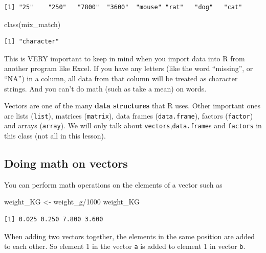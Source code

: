 \documentclass[
  letterpaper,
  DIV=11,
  numbers=noendperiod,
  oneside]{scrreprt}
\newenvironment{Shaded}{\begin{snugshade}}{\end{snugshade}}
\newcommand{\DecValTok}[1]{\textcolor[rgb]{0.68,0.00,0.00}{#1}}
\newcommand{\FunctionTok}[1]{\textcolor[rgb]{0.28,0.35,0.67}{#1}}
\newcommand{\NormalTok}[1]{\textcolor[rgb]{0.00,0.23,0.31}{#1}}
\newcommand{\OtherTok}[1]{\textcolor[rgb]{0.00,0.23,0.31}{#1}}
\newcommand{\SpecialCharTok}[1]{\textcolor[rgb]{0.37,0.37,0.37}{#1}}
\begin{document}
\begin{verbatim}
[1] "25"    "250"   "7800"  "3600"  "mouse" "rat"   "dog"   "cat"  
\end{verbatim}

\begin{Shaded}
\begin{Highlighting}[]
\FunctionTok{class}\NormalTok{(mix\_match)}
\end{Highlighting}
\end{Shaded}

\begin{verbatim}
[1] "character"
\end{verbatim}

This is VERY important to keep in mind when you import data into R from
another program like Excel. If you have any letters (like the word
``missing'', or ``NA'') in a column, all data from that column will be
treated as character strings. And you can't do math (such as take a
mean) on words.

Vectors are one of the many \textbf{data structures} that R uses. Other
important ones are lists (\texttt{list}), matrices (\texttt{matrix}),
data frames (\texttt{data.frame}), factors (\texttt{factor}) and arrays
(\texttt{array}). We will only talk about
\texttt{vectors},\texttt{data.frame}s and \texttt{factors} in this class
(not all in this lesson).

\subsection{Doing math on vectors}\label{doing-math-on-vectors}

You can perform math operations on the elements of a vector such as

\begin{Shaded}
\begin{Highlighting}[]
\NormalTok{weight\_KG }\OtherTok{\textless{}{-}}\NormalTok{ weight\_g}\SpecialCharTok{/}\DecValTok{1000}
\NormalTok{weight\_KG}
\end{Highlighting}
\end{Shaded}

\begin{verbatim}
[1] 0.025 0.250 7.800 3.600
\end{verbatim}

When adding two vectors together, the elements in the same position are
added to each other. So element 1 in the vector \texttt{a} is added to
element 1 in vector \texttt{b}.
\end{document}
